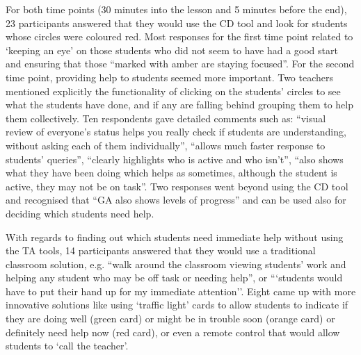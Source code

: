 
For both time points (30 minutes into the lesson and 5 minutes before
the end), 23 participants answered that they would use the
CD tool and look for students whose circles were coloured red. 
Most responses for the first time point
related to `keeping an eye' on those students 
who did not seem to have had a good start and
ensuring that those ``marked with amber are staying focused''.
For the second time point, providing help to students seemed more important.
Two teachers mentioned explicitly the
functionality of clicking on the students' circles to see what the students have
done, and if any are falling behind grouping them to help them collectively. 
Ten respondents gave detailed comments such as: ``visual review of everyone's status
helps you really check if students are understanding, without asking
each of them individually'', ``allows much faster response to students' queries'', 
``clearly highlights who is active and who isn't'', 
``also shows what they have been doing which helps as sometimes,
although the student is active, they may not be on task''. 
Two responses went beyond using the CD tool and recognised
that ``GA also shows levels of progress'' and can be used also for
deciding which students need help. 
 
With regards to finding out which students need immediate help without
using the TA tools, 14 participants answered that they
would use a traditional classroom solution, e.g. ``walk around the
classroom viewing students' work and helping any student who may be
off task or needing help'', or ```students would have to put their hand up
for my immediate attention''. Eight came up with more innovative
solutions like using `traffic light' cards to allow students to indicate if
they are doing well (green card) or might be in trouble soon (orange
card) or definitely need help now (red card), or even a remote
control that would allow students to `call the teacher'. 

